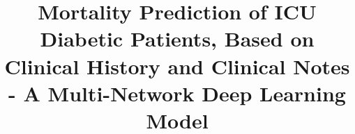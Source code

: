 \documentclass{sigkddExp}
\begin{document}
%

\title{Mortality Prediction of ICU Diabetic Patients, Based on Clinical History and Clinical Notes - A Multi-Network Deep Learning Model}
%

%

\end{document}
